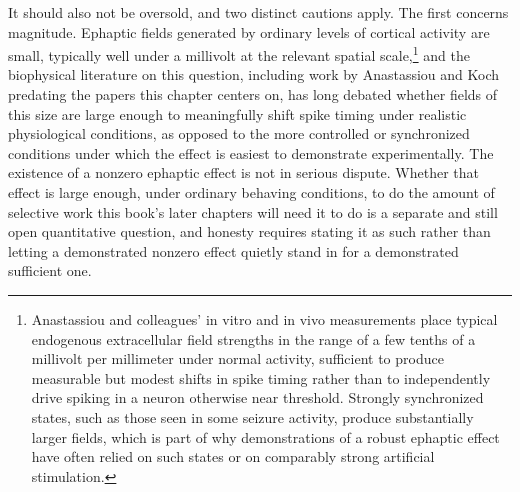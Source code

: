 \documentclass[11pt]{book}
\begin{document}
It should also not be oversold, and two distinct cautions apply. The first concerns magnitude. Ephaptic fields generated by ordinary levels of cortical activity are small, typically well under a millivolt at the relevant spatial scale,\footnote{Anastassiou and colleagues' in vitro and in vivo measurements \cite{anastassiou2011} place typical endogenous extracellular field strengths in the range of a few tenths of a millivolt per millimeter under normal activity, sufficient to produce measurable but modest shifts in spike timing rather than to independently drive spiking in a neuron otherwise near threshold. Strongly synchronized states, such as those seen in some seizure activity, produce substantially larger fields, which is part of why demonstrations of a robust ephaptic effect have often relied on such states or on comparably strong artificial stimulation.} and the biophysical literature on this question, including work by Anastassiou and Koch \cite{anastassiou2011} predating the papers this chapter centers on, has long debated whether fields of this size are large enough to meaningfully shift spike timing under realistic physiological conditions, as opposed to the more controlled or synchronized conditions under which the effect is easiest to demonstrate experimentally. The existence of a nonzero ephaptic effect is not in serious dispute. Whether that effect is large enough, under ordinary behaving conditions, to do the amount of selective work this book's later chapters will need it to do is a separate and still open quantitative question, and honesty requires stating it as such rather than letting a demonstrated nonzero effect quietly stand in for a demonstrated sufficient one.
\end{document}
